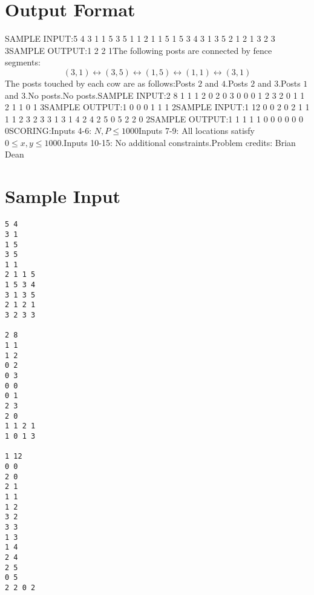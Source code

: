 \documentclass[12pt]{article}
\begin{document}
\section*{Output Format}
SAMPLE INPUT:5 4
3 1
1 5
3 5
1 1
2 1 1 5
1 5 3 4
3 1 3 5
2 1 2 1
3 2 3 3SAMPLE OUTPUT:1
2
2
1The following posts are connected by fence segments:$$(3,1)\leftrightarrow (3, 5) \leftrightarrow  (1,5) \leftrightarrow (1,1) \leftrightarrow (3,1)$$The posts touched by each cow are as follows:Posts $2$ and $4$.Posts $2$ and $3$.Posts $1$ and $3$.No posts.No posts.SAMPLE INPUT:2 8
1 1
1 2
0 2
0 3
0 0
0 1
2 3
2 0
1 1 2 1
1 0 1 3SAMPLE OUTPUT:1
0
0
0
1
1
1
2SAMPLE INPUT:1 12
0 0
2 0
2 1
1 1
1 2
3 2
3 3
1 3
1 4
2 4
2 5
0 5
2 2 0 2SAMPLE OUTPUT:1
1
1
1
1
0
0
0
0
0
0
0SCORING:Inputs 4-6: $N,P\le 1000$Inputs 7-9: All locations satisfy $0\le x, y\le 1000$.Inputs 10-15: No additional constraints.Problem credits: Brian Dean

\section*{Sample Input}
\begin{verbatim}
5 4
3 1
1 5
3 5
1 1
2 1 1 5
1 5 3 4
3 1 3 5
2 1 2 1
3 2 3 3

2 8
1 1
1 2
0 2
0 3
0 0
0 1
2 3
2 0
1 1 2 1
1 0 1 3

1 12
0 0
2 0
2 1
1 1
1 2
3 2
3 3
1 3
1 4
2 4
2 5
0 5
2 2 0 2
\end{verbatim}
\end{document}
